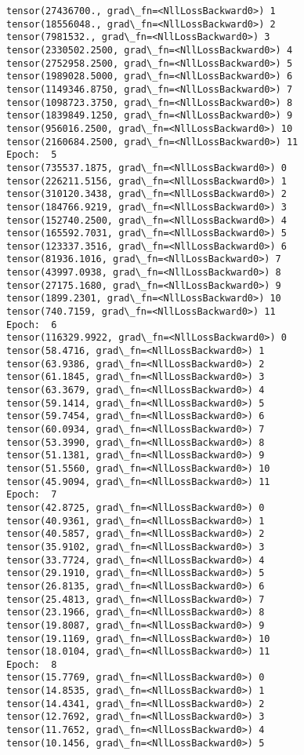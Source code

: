 \documentclass[11pt]{article}
\begin{document}
\begin{Verbatim}[commandchars=\\\{\}]
tensor(27436700., grad\_fn=<NllLossBackward0>) 1
tensor(18556048., grad\_fn=<NllLossBackward0>) 2
tensor(7981532., grad\_fn=<NllLossBackward0>) 3
tensor(2330502.2500, grad\_fn=<NllLossBackward0>) 4
tensor(2752958.2500, grad\_fn=<NllLossBackward0>) 5
tensor(1989028.5000, grad\_fn=<NllLossBackward0>) 6
tensor(1149346.8750, grad\_fn=<NllLossBackward0>) 7
tensor(1098723.3750, grad\_fn=<NllLossBackward0>) 8
tensor(1839849.1250, grad\_fn=<NllLossBackward0>) 9
tensor(956016.2500, grad\_fn=<NllLossBackward0>) 10
tensor(2160684.2500, grad\_fn=<NllLossBackward0>) 11
Epoch:  5
tensor(735537.1875, grad\_fn=<NllLossBackward0>) 0
tensor(226211.5156, grad\_fn=<NllLossBackward0>) 1
tensor(310120.3438, grad\_fn=<NllLossBackward0>) 2
tensor(184766.9219, grad\_fn=<NllLossBackward0>) 3
tensor(152740.2500, grad\_fn=<NllLossBackward0>) 4
tensor(165592.7031, grad\_fn=<NllLossBackward0>) 5
tensor(123337.3516, grad\_fn=<NllLossBackward0>) 6
tensor(81936.1016, grad\_fn=<NllLossBackward0>) 7
tensor(43997.0938, grad\_fn=<NllLossBackward0>) 8
tensor(27175.1680, grad\_fn=<NllLossBackward0>) 9
tensor(1899.2301, grad\_fn=<NllLossBackward0>) 10
tensor(740.7159, grad\_fn=<NllLossBackward0>) 11
Epoch:  6
tensor(116329.9922, grad\_fn=<NllLossBackward0>) 0
tensor(58.4716, grad\_fn=<NllLossBackward0>) 1
tensor(63.9386, grad\_fn=<NllLossBackward0>) 2
tensor(61.1845, grad\_fn=<NllLossBackward0>) 3
tensor(63.3679, grad\_fn=<NllLossBackward0>) 4
tensor(59.1414, grad\_fn=<NllLossBackward0>) 5
tensor(59.7454, grad\_fn=<NllLossBackward0>) 6
tensor(60.0934, grad\_fn=<NllLossBackward0>) 7
tensor(53.3990, grad\_fn=<NllLossBackward0>) 8
tensor(51.1381, grad\_fn=<NllLossBackward0>) 9
tensor(51.5560, grad\_fn=<NllLossBackward0>) 10
tensor(45.9094, grad\_fn=<NllLossBackward0>) 11
Epoch:  7
tensor(42.8725, grad\_fn=<NllLossBackward0>) 0
tensor(40.9361, grad\_fn=<NllLossBackward0>) 1
tensor(40.5857, grad\_fn=<NllLossBackward0>) 2
tensor(35.9102, grad\_fn=<NllLossBackward0>) 3
tensor(33.7724, grad\_fn=<NllLossBackward0>) 4
tensor(29.1910, grad\_fn=<NllLossBackward0>) 5
tensor(26.8135, grad\_fn=<NllLossBackward0>) 6
tensor(25.4813, grad\_fn=<NllLossBackward0>) 7
tensor(23.1966, grad\_fn=<NllLossBackward0>) 8
tensor(19.8087, grad\_fn=<NllLossBackward0>) 9
tensor(19.1169, grad\_fn=<NllLossBackward0>) 10
tensor(18.0104, grad\_fn=<NllLossBackward0>) 11
Epoch:  8
tensor(15.7769, grad\_fn=<NllLossBackward0>) 0
tensor(14.8535, grad\_fn=<NllLossBackward0>) 1
tensor(14.4341, grad\_fn=<NllLossBackward0>) 2
tensor(12.7692, grad\_fn=<NllLossBackward0>) 3
tensor(11.7652, grad\_fn=<NllLossBackward0>) 4
tensor(10.1456, grad\_fn=<NllLossBackward0>) 5

\end{Verbatim}
\end{document}
